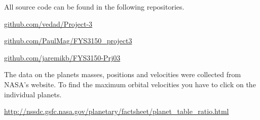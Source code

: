 All source code can be found in the following repositories.

\url{github.com/vedad/Project-3}

\url{github.com/PaulMag/FYS3150_project3}

\url{github.com/jaremikb/FYS3150-Prj03}

The data on the planets masses, positions and velocities were collected from NASA's website. To find the maximum orbital velocities you have to click on the individual planets.

\url{http://nssdc.gsfc.nasa.gov/planetary/factsheet/planet_table_ratio.html}
